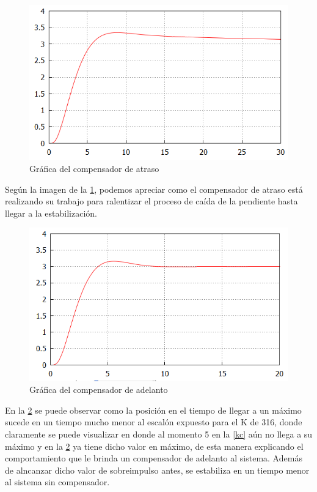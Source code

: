 \documentclass[12pt,letterpaper]{article}
\begin{document}
 \begin{figure}[H]
            \centering
            \centerline{\includegraphics[width=125mm]{kcat.png}}
            \caption{Gráfica del compensador de atraso}
            \label{gca}
\end{figure} 

Según la imagen de la \ref{gca}, podemos apreciar como el compensador de atraso está realizando su trabajo para ralentizar el proceso de caída de la pendiente hasta llegar a la estabilización. 


 \begin{figure}[H]
            \centering
            \centerline{\includegraphics[width=125mm]{kad.png}}
            \caption{Gráfica del compensador de adelanto}
            \label{kad}
\end{figure}

En la \ref{kad} se puede observar como la posición en el tiempo de llegar a un máximo sucede en un tiempo mucho menor al escalón expuesto para el K de 316, donde claramente se puede visualizar en donde al momento 5 en la \ref{kc} aún no llega a su máximo y en la \ref{kad} ya tiene dicho valor en máximo, de esta manera explicando el comportamiento que le brinda un compensador de adelanto al sistema. Además de alncanzar dicho valor de sobreimpulso antes, se estabiliza en un tiempo menor al sistema sin compensador.
\end{document}
